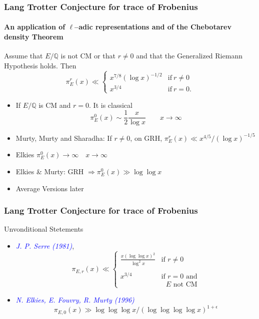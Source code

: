 \documentclass[10pt,handout]{beamer} %
\newcommand{\Q}{\mathbb Q}
\theoremstyle{definition}
\begin{document}
\begin{frame}
\frametitle{Lang Trotter Conjecture for trace of Frobenius} 
\framesubtitle{An application of $\ell$--adic representations and of the Chebotarev density Theorem}\pause

\begin{theorem}[Serre]
Assume that $E/\Q$ is not CM or that $r\neq0$ and that the Generalized Riemann 
Hypothesis holds. Then\pause
$$\pi_E^r(x)\ll\begin{cases} x^{7/8}(\log x)^{-1/2}&\text{if}\ r\ne0\\ x^{3/4}&\text{if}\ r=0.\end{cases}$$  
\end{theorem}\pause

\begin{itemize}[<+-| alert@+>]
 \item If $E/\Q$ is CM and $r=0$. It is classical
 $$\pi_E^0(x)\sim\frac12\frac{x}{\log x}\qquad x\rightarrow\infty$$
 \item Murty, Murty and Sharadha: If $r\ne0$, on GRH, $\pi_E^r(x)\ll x^{4/5}/(\log x)^{-1/5}$
 \item Elkies $\pi_E^0(x)\rightarrow\infty\quad x\rightarrow\infty$
 \item Elkies \& Murty: GRH $\Longrightarrow\pi_E^0(x)\gg\log\log x$
 \item Average Versions later
 \end{itemize}\pause

\end{frame}

\begin{frame}
\frametitle{Lang Trotter Conjecture for trace of Frobenius}

\begin{block}{Unvonditional Stetements}\pause
\begin{itemize}[<+-| alert@+>]
\item \textcolor{blue}{\textit{J. P. Serre (1981)}},\pause  
$$\pi_{E,r}(x) \ll \left\{ \begin{array}{ll}
\frac{x(\log\log x)^2}{\log^2 x}& \mbox{if $r \neq 0$} \\  \\%
{x^{3/4}} & \text{if }r = 0\text{ and}\\ & \text{ $E$ not CM} \end{array} \right.$$\pause
\item \textcolor{blue}{\textit{N. Elkies, E. Fouvry, R. Murty (1996)}}
$$\pi_{E,0}(x)\gg \log\log\log x/(\log\log\log\log
x)^{1+\epsilon}$$
\end{itemize}\pause
\end{block}
\end{frame}
\end{document}
